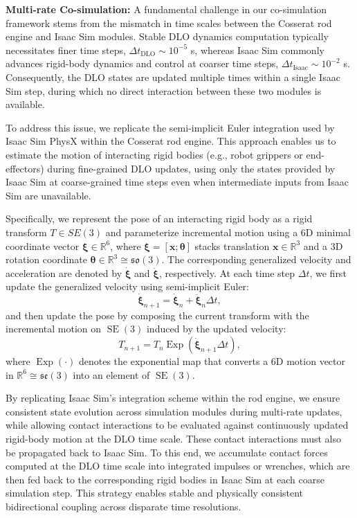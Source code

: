 \documentclass[letterpaper, 10 pt, conference]{ieeeconf}  %
\DeclareMathOperator{\Exp}{Exp}
\begin{document}
\noindent\textbf{Multi-rate Co-simulation:} A fundamental challenge in our co-simulation framework stems from the mismatch in time scales between the Cosserat rod engine and Isaac Sim modules. Stable DLO dynamics computation typically necessitates finer time steps, $\Delta t_{\mathrm{DLO}} \sim 10^{-5}$ s, whereas Isaac Sim commonly advances rigid-body dynamics and control at coarser time steps, $\Delta t_{\mathrm{Isaac}} \sim 10^{-2}$ s. Consequently, the DLO states are updated multiple times within a single Isaac Sim step, during which no direct interaction between these two modules is available.

To address this issue, we replicate the semi-implicit Euler integration used by Isaac Sim PhysX within the Cosserat rod engine. This approach enables us to estimate the motion of interacting rigid bodies (e.g., robot grippers or end-effectors) during fine-grained DLO updates, using only the states provided by Isaac Sim at coarse-grained time steps even when intermediate inputs from Isaac Sim are unavailable.

Specifically, we represent the pose of an interacting rigid body as a rigid transform $T\in SE(3)$ and parameterize incremental motion using a 6D minimal coordinate vector $\boldsymbol{\xi}\in\mathbb{R}^6$, where $\boldsymbol{\xi}=[\mathbf{x};\boldsymbol{\theta}]$ stacks translation $\mathbf{x}\in\mathbb{R}^3$
and a 3D rotation coordinate $\boldsymbol{\theta}\in\mathbb{R}^3\cong\mathfrak{so}(3)$. The corresponding generalized velocity and acceleration are denoted by $\dot{\boldsymbol{\xi}}$ and $\ddot{\boldsymbol{\xi}}$, respectively. At each time step $\Delta t$, we first update the generalized velocity using semi-implicit Euler:
\begin{equation}
\dot{\boldsymbol{\xi}}_{n+1}=\dot{\boldsymbol{\xi}}_n+\ddot{\boldsymbol{\xi}}_n\Delta t,
\end{equation}
and then update the pose by composing the current transform with the incremental motion on $\operatorname{SE}(3)$ induced by the updated velocity:
\begin{equation}
    T_{n+1}=T_n\Exp(\dot{\boldsymbol{\xi}}_{n+1}\Delta t),
\end{equation}
where $\Exp(\cdot)$ denotes the exponential map that converts a 6D motion vector in $\mathbb{R}^6\cong\mathfrak{se}(3)$ into an element of $\operatorname{SE}(3)$. 

By replicating Isaac Sim's integration scheme within the rod engine, we ensure consistent state evolution across simulation modules during multi-rate updates, while allowing contact interactions to be evaluated against continuously updated rigid-body motion at the DLO time scale. These contact interactions must also be propagated back to Isaac Sim. To this end, we accumulate contact forces computed at the DLO time scale into integrated impulses or wrenches, which are then fed back to the corresponding rigid bodies in Isaac Sim at each coarse simulation step. This strategy enables stable and physically consistent bidirectional coupling across disparate time resolutions.
\end{document}
